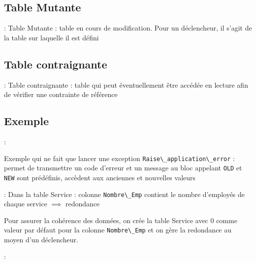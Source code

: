 \documentclass[10pt]{beamer}
\begin{document}
\subsection{Table Mutante}
\begin{frame}{\secname : \subsecname}
    Table Mutante : table en cours de modification. Pour un déclencheur, il s'agit de la table sur laquelle il est défini
\end{frame}

\subsection{Table contraignante}
\begin{frame}{\secname : \subsecname}
    Table contraignante : table qui peut éventuellement être accédée en lecture afin de vérifier une contrainte de référence
\end{frame}
\subsection{Exemple}
\begin{frame}{\secname : \subsecname}
    
    Exemple qui ne fait que lancer une exception
    \lstinline[language=plsql]!Raise\_application\_error! : permet de transmettre un code d'erreur et un message au bloc appelant
    \lstinline[language=plsql]!OLD! et \lstinline[language=plsql]!NEW! sont prédéfinis, accèdent aux anciennes et nouvelles valeurs
\end{frame}

\begin{frame}[allowframebreaks]{\secname : \subsecname}
    Dans la table Service : colonne \lstinline[language=plsql]!Nombre\_Emp! contient le nombre d'employés de chaque service $\implies$ redondance
    
    Pour assurer la cohérence des données, on crée la table Service avec 0 comme valeur par défaut pour la colonne \lstinline[language=plsql]!Nombre\_Emp! et on gère la redondance au moyen d'un déclencheur.
\end{frame}

\begin{frame}{\secname : \subsecname}
    
\end{frame}
\end{document}
